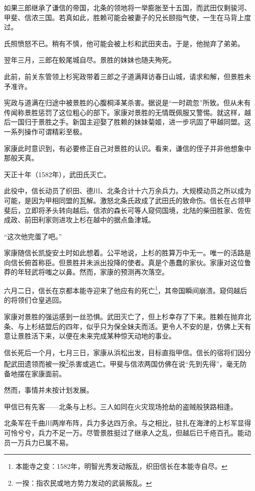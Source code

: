 \documentclass[
]{book}
\begin{document}
如果三郎继承了谦信的帝国，北条的领地将一举膨胀至十五国，而武田仅剩骏河、甲斐、信浓三国。若真如此，胜赖可能会被妻子的兄长颐指气使，一生在马背上度过。

氏照愤怒不已。稍有不慎，他可能会被上杉和武田夹击。于是，他抛弃了弟弟。

翌年三月，三郎在鲛尾城自尽。景胜的妹妹也随夫殉死。

此前，前关东管领上杉宪政带着三郎之子道满拜访春日山城，请求和解，但景胜未予准许。

宪政与道满在归途中被景胜的心腹桐泽某杀害。据说是``一时疏忽''所致。但从未有传闻称景胜惩罚了这位粗心的部下。家康对景胜的无情既佩服又警惕。就这样，越后一国归于景胜之手。新国主迎娶了胜赖的妹妹菊姬，进一步巩固了甲越同盟。这一系列操作可谓精彩至极。

家康此时意识到，有必要修正自己对景胜的认识。看来，谦信的侄子并非他想象中那般天真。

天正十年（1582年），武田氏灭亡。

此役中，信长动员了织田、德川、北条合计十六万余兵力。大规模动员之所以成为可能，是因为甲相同盟的瓦解。激怒北条氏政成了武田氏的致命伤。信长在占领甲斐后，立即将矛头转向越后。信浓的森长可等人窥伺国境，北陆的柴田胜家、佐佐成政、前田利家则进攻上杉在越中的据点鱼津城。

``这次他完蛋了吧。''

家康随信长凯旋安土时如此想着。公平地说，上杉的胜算万中无一。唯一的活路是向信长俯首称臣。但景胜并未派出投降的使者。真是个愚蠢的家伙。家康对这位鲁莽的年轻武将嗤之以鼻。然而，家康的预测再次落空。

六月二日，信长在京都本能寺迎来了他应有的死亡\footnote{本能寺之变：1582年，明智光秀发动叛乱，织田信长在本能寺自尽。}，其帝国瞬间崩溃。窥伺越后的将领们仓皇逃回。

家康对景胜的强运感到一丝恐惧。武田灭亡了，但上杉幸存了下来。胜赖在抛弃北条、与上杉结盟后的四年，似乎只为保全妹夫而活。更令人不安的是，仿佛上天有意让景胜活下来，以便在未来完成某种惊天动地的事业。

信长死后一个月，七月三日，家康从浜松出发，目标直指甲信。信长的宿将们因分配武田遗领而被一揆\footnote{一揆：指农民或地方势力发动的武装叛乱。}杀害或逃亡。甲斐与信浓两国仿佛在说``先到先得''，毫无防备地摆在家康面前。

然而，事情并未按计划发展。

甲信已有先客------北条与上杉。三人如同在火灾现场抢劫的盗贼般狭路相逢。

北条军在千曲川两岸布阵，兵力多达四万余。与之相比，驻扎在海津的上杉军显得可怜兮兮，兵力不足一万。尽管景胜挺过了继承人之乱，但越后已千疮百孔。能动员一万兵力已属不易。
\end{document}
